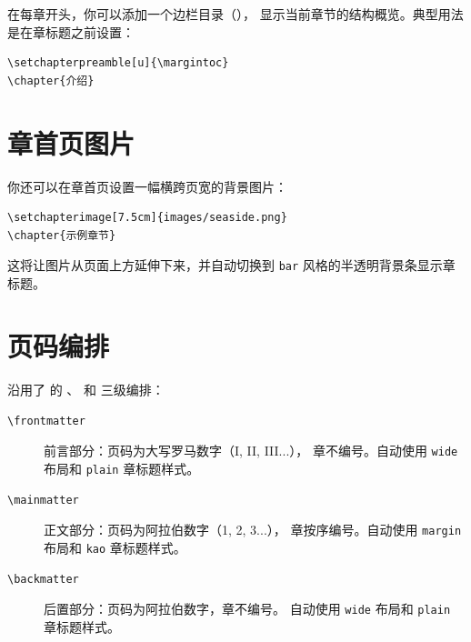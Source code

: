 在每章开头，你可以添加一个边栏目录（），
显示当前章节的结构概览。典型用法是在章标题之前设置：

\begin{lstlisting}[caption=使用边栏目录]
\setchapterpreamble[u]{\margintoc}
\chapter{介绍}
\end{lstlisting}



\section{章首页图片}

你还可以在章首页设置一幅横跨页宽的背景图片：

\begin{lstlisting}[caption=设置章首页图片]
\setchapterimage[7.5cm]{images/seaside.png}
\chapter{示例章节}
\end{lstlisting}

这将让图片从页面上方延伸下来，并自动切换到 \texttt{bar} 风格的半透明背景条显示章标题。

\section{页码编排}

 沿用了 \KOMAScript 的 、
和  三级编排：

\begin{description}
    \item[\texttt{\textbackslash frontmatter}] 前言部分：页码为大写罗马数字（I, II, III...），
        章不编号。自动使用 \texttt{wide} 布局和 \texttt{plain} 章标题样式。
    \item[\texttt{\textbackslash mainmatter}] 正文部分：页码为阿拉伯数字（1, 2, 3...），
        章按序编号。自动使用 \texttt{margin} 布局和 \texttt{kao} 章标题样式。
    \item[\texttt{\textbackslash backmatter}] 后置部分：页码为阿拉伯数字，章不编号。
        自动使用 \texttt{wide} 布局和 \texttt{plain} 章标题样式。
\end{description}

